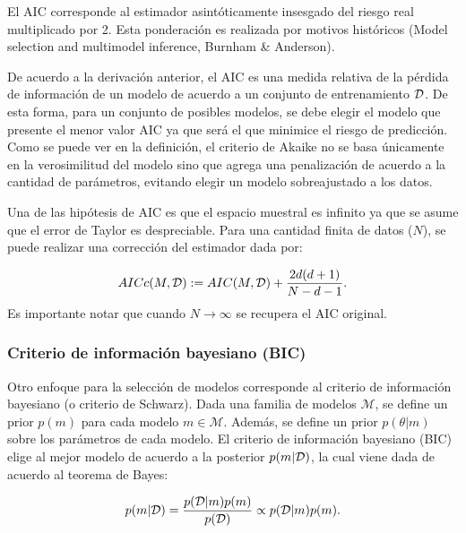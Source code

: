 \begin{remark}
El AIC corresponde al estimador asintóticamente insesgado del riesgo real multiplicado por 2. Esta ponderación es realizada por motivos históricos (Model selection and multimodel inference, Burnham \& Anderson).
\end{remark}

De acuerdo a la derivación anterior, el AIC es una medida relativa de la pérdida de información de un modelo de acuerdo a un conjunto de entrenamiento ${\mathcal D}$. De esta forma, para un conjunto de posibles modelos, se debe elegir el modelo que presente el menor valor AIC ya que será el que minimice el riesgo de predicción.\\

Como se puede ver en la definición, el criterio de Akaike no se basa únicamente en la verosimilitud del modelo sino que agrega una penalización de acuerdo a la cantidad de parámetros, evitando elegir un modelo sobreajustado a los datos. 

\begin{remark}
	Una de las hipótesis de AIC es que el espacio muestral es infinito ya que se asume que el error de Taylor es despreciable. Para una cantidad finita de datos ($N$), se puede realizar una corrección del estimador dada por:
	
	\begin{equation}
		AICc(M,{\mathcal D}) := AIC(M,{\mathcal D}) + \frac{2d(d+1)}{N-d-1}.
	\end{equation}
Es importante notar que cuando $N\to\infty$ se recupera el AIC original.
\end{remark}

\subsubsection{Criterio de información bayesiano (BIC)}

Otro enfoque para la selección de modelos corresponde al criterio de información bayesiano (o criterio de Schwarz). Dada una familia de modelos $\mathcal{M}$, se define un prior $p(m)$ para cada modelo $m\in\mathcal{M}$. Además, se define un prior $p(\theta|m)$ sobre los parámetros de cada modelo. El criterio de información bayesiano (BIC) elige al mejor modelo de acuerdo a la posterior $p(m|{\mathcal D})$, la cual viene dada de acuerdo al teorema de Bayes:

\begin{equation}
	p(m|{\mathcal D})=\frac{p({\mathcal D}|m)p(m)}{p({\mathcal D})}\propto p({\mathcal D}|m)p(m).
\end{equation}

